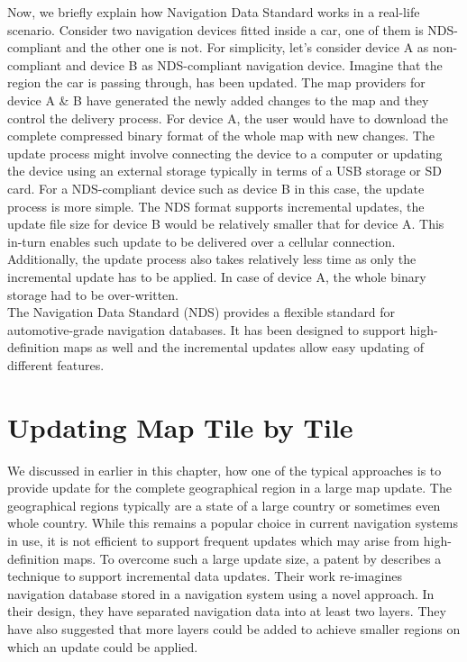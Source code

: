 Now, we briefly explain how Navigation Data Standard works in a real-life scenario. Consider two navigation devices fitted inside a car, one of them is NDS-compliant and the other one is not. For simplicity, let's consider device A as non-compliant and device B as NDS-compliant navigation device. Imagine that the region the car is passing through, has been updated. The map providers for device A \& B have generated the newly added changes to the map and they control the delivery process. For device A, the user would have to download the complete compressed binary format of the whole map with new changes. The update process might involve connecting the device to a computer or updating the device using an external storage typically in terms of a USB storage or SD card. For a NDS-compliant device such as device B in this case, the update process is more simple. The NDS format supports incremental updates, the update file size for device B would be relatively smaller that for device A. This in-turn enables such update to be delivered over a cellular connection. Additionally, the update process also takes relatively less time as only the incremental update has to be applied. In case of device A, the whole binary storage had to be over-written. \\

The Navigation Data Standard (NDS) provides a flexible standard for automotive-grade navigation databases. It has been designed to support high-definition maps as well and the incremental updates allow easy updating of different features. 

\section{Updating Map Tile by Tile}
We discussed in earlier in this chapter, how one of the typical approaches is to provide update for the complete geographical region in a large map update. The geographical regions typically are a state of a large country or sometimes even whole country. While this remains a popular choice in current navigation systems in use, it is not efficient to support frequent updates which may arise from high-definition maps. To overcome such a large update size, a patent by \citet{fischer2012technique} describes a technique to support incremental data updates. Their work re-imagines navigation database stored in a navigation system using a novel approach. In their design, they have separated navigation data into at least two layers. They have also suggested that more layers could be added to achieve smaller regions on which an update could be applied. \\


